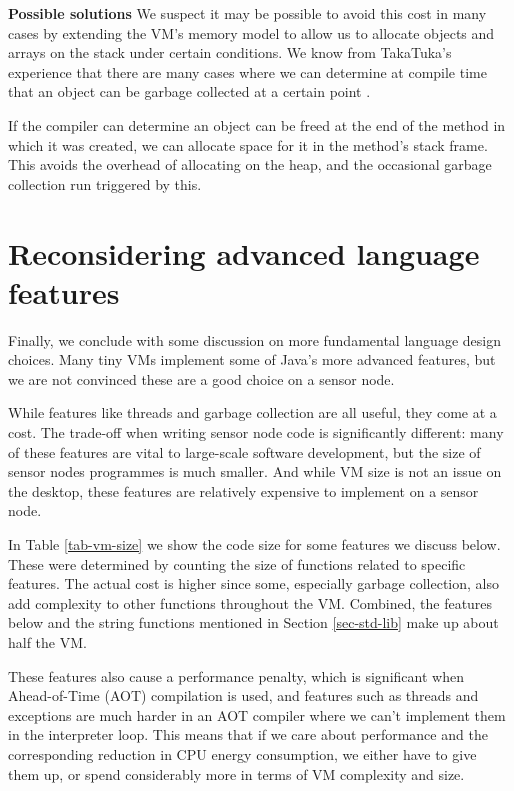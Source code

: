 \textbf{Possible solutions}
We suspect it may be possible to avoid this cost in many cases by extending the VM's memory model to allow us to allocate objects and arrays on the stack under certain conditions. We know from TakaTuka's experience that there are many cases where we can determine at compile time that an object can be garbage collected at a certain point \cite{aslam2010optimized}.


If the compiler can determine an object can be freed at the end of the method in which it was created, we can allocate space for it in the method's stack frame. This avoids the overhead of allocating on the heap, and the occasional garbage collection run triggered by this.



\section{Reconsidering advanced language features}
\label{sec-advanced-features}
Finally, we conclude with some discussion on more fundamental language design choices. Many tiny VMs implement some of Java's more advanced features, but we are not convinced these are a good choice on a sensor node.

While features like threads and garbage collection are all useful, they come at a cost. The trade-off when writing sensor node code is significantly different: many of these features are vital to large-scale software development, but the size of sensor nodes programmes is much smaller. And while VM size is not an issue on the desktop, these features are relatively expensive to implement on a sensor node.

In Table \ref{tab-vm-size} we show the code size for some features we discuss below. These were determined by counting the size of functions related to specific features. The actual cost is higher since some, especially garbage collection, also add complexity to other functions throughout the VM. Combined, the features below and the string functions mentioned in Section \ref{sec-std-lib} make up about half the VM.

These features also cause a performance penalty, which is significant when Ahead-of-Time (AOT) compilation is used, and features such as threads and exceptions are much harder in an AOT compiler where we can't implement them in the interpreter loop. This means that if we care about performance and the corresponding reduction in CPU energy consumption, we either have to give them up, or spend considerably more in terms of VM complexity and size.

